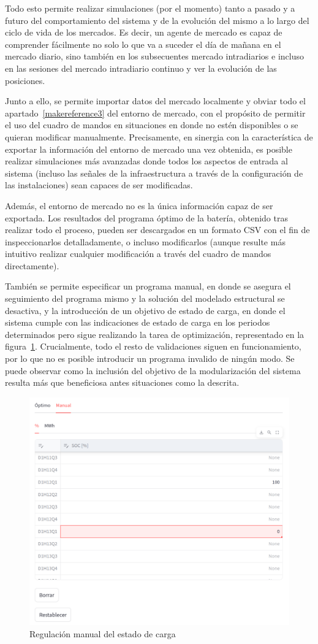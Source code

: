 Todo esto permite realizar simulaciones (por el momento) tanto a pasado y a futuro del comportamiento del sistema y de la evolución del mismo a lo largo del ciclo de vida de los mercados. Es decir, un agente de mercado es capaz de comprender fácilmente no solo lo que va a suceder el día de mañana en el mercado diario, sino también en los subsecuentes mercado intradiarios e incluso en las sesiones del mercado intradiario continuo y ver la evolución de las posiciones.

Junto a ello, se permite importar datos del mercado localmente y obviar todo el apartado~\ref{makereference3} del entorno de mercado, con el propósito de permitir el uso del cuadro de mandos en situaciones en donde no estén disponibles o se quieran modificar manualmente. Precisamente, en sinergia con la característica de exportar la información del entorno de mercado una vez obtenida, es posible realizar simulaciones más avanzadas donde todos los aspectos de entrada al sistema (incluso las señales de la infraestructura a través de la configuración de las instalaciones) sean capaces de ser modificadas.

Además, el entorno de mercado no es la única información capaz de ser exportada. Los resultados del programa óptimo de la batería, obtenido tras realizar todo el proceso, pueden ser descargados en un formato CSV con el fin de inspeccionarlos detalladamente, o incluso modificarlos (aunque resulte más intuitivo realizar cualquier modificación a través del cuadro de mandos directamente).

También se permite especificar un programa manual, en donde se asegura el seguimiento del programa mismo y la solución del modelado estructural se desactiva, y la introducción de un objetivo de estado de carga, en donde el sistema cumple con las indicaciones de estado de carga en los periodos determinados pero sigue realizando la tarea de optimización, representado en la figura~\ref{fig:soc-manual}. Crucialmente, todo el resto de validaciones siguen en funcionamiento, por lo que no es posible introducir un programa invalido de ningún modo. Se puede observar como la inclusión del objetivo de la modularización del sistema resulta más que beneficiosa antes situaciones como la descrita.

\begin{figure}
\centering
\includegraphics[width=0.5\linewidth]{figures/soc-manual.png}
\caption{Regulación manual del estado de carga}
\label{fig:soc-manual}
\end{figure}

